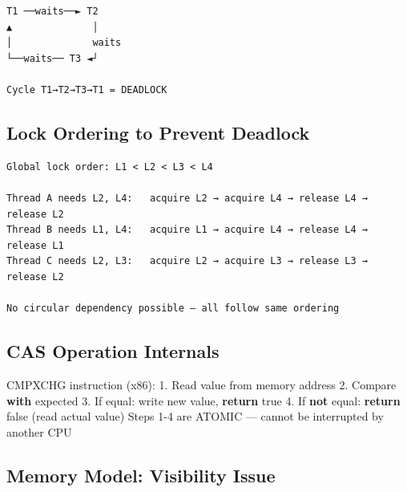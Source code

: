 \documentclass[11pt]{article}
\newenvironment{Shaded}{\begin{snugshade}}{\end{snugshade}}
\newcommand{\ControlFlowTok}[1]{\textcolor[rgb]{0.99,0.74,0.29}{\textbf{#1}}}
\newcommand{\DecValTok}[1]{\textcolor[rgb]{0.96,0.45,0.00}{#1}}
\newcommand{\FloatTok}[1]{\textcolor[rgb]{0.96,0.45,0.00}{#1}}
\newcommand{\ImportTok}[1]{\textcolor[rgb]{0.15,0.68,0.38}{#1}}
\newcommand{\KeywordTok}[1]{\textcolor[rgb]{0.81,0.81,0.76}{\textbf{#1}}}
\newcommand{\NormalTok}[1]{\textcolor[rgb]{0.81,0.81,0.76}{#1}}
\newcommand{\OperatorTok}[1]{\textcolor[rgb]{0.81,0.81,0.76}{#1}}
\begin{document}
\setcodelang{}

\begin{verbatim}
T1 ──waits──► T2
▲              │
│              waits
└──waits── T3 ◄┘

Cycle T1→T2→T3→T1 = DEADLOCK
\end{verbatim}

\subsection{Lock Ordering to Prevent Deadlock}\label{lock-ordering-to-prevent-deadlock}

\setcodelang{}

\begin{verbatim}
Global lock order: L1 < L2 < L3 < L4

Thread A needs L2, L4:   acquire L2 → acquire L4 → release L4 → release L2
Thread B needs L1, L4:   acquire L1 → acquire L4 → release L4 → release L1
Thread C needs L2, L3:   acquire L2 → acquire L3 → release L3 → release L2

No circular dependency possible — all follow same ordering
\end{verbatim}

\subsection{CAS Operation Internals}\label{cas-operation-internals}


\begin{Shaded}
\begin{Highlighting}[]
\NormalTok{CMPXCHG instruction (x86):}
\FloatTok{1.}\NormalTok{ Read value }\ImportTok{from}\NormalTok{ memory address}
\FloatTok{2.}\NormalTok{ Compare }\ControlFlowTok{with}\NormalTok{ expected}
\FloatTok{3.}\NormalTok{ If equal: write new value, }\ControlFlowTok{return}\NormalTok{ true}
\FloatTok{4.}\NormalTok{ If }\KeywordTok{not}\NormalTok{ equal: }\ControlFlowTok{return}\NormalTok{ false (read actual value)}
\NormalTok{Steps }\DecValTok{1}\OperatorTok{{-}}\DecValTok{4}\NormalTok{ are ATOMIC — cannot be interrupted by another CPU}
\end{Highlighting}
\end{Shaded}

\subsection{Memory Model: Visibility Issue}\label{memory-model-visibility-issue}
\end{document}
